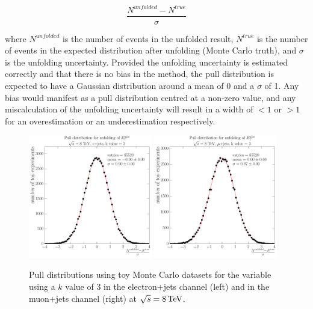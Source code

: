 \begin{equation}
\frac{N^{unfolded}-N^{true}}{\sigma}
\label{eq:pulls}
\end{equation}

where $N^{unfolded}$ is the number of events in the unfolded result, $N^{true}$ is the number of events in the
expected distribution after unfolding (Monte Carlo truth), and $\sigma$ is the unfolding uncertainty. Provided
the unfolding uncertainty is estimated correctly and that there is no bias in the method, the pull
distribution is expected to have a Gaussian distribution around a mean of 0 and a $\sigma$ of 1. Any bias
would manifest as a pull distribution centred at a non-zero value, and any miscalculation of the
unfolding uncertainty will result in a width of $<1$ or $>1$ for an overestimation or an underestimation
respectively.

\begin{figure}[hbtp]
    \centering
     \includegraphics[width=0.48\textwidth]{Chapters/04_Analysis/04b_XSections/images/unfolding_pulls/8TeV/MET/electron/kv3/pull_from_files_all_bins_stats_65520.pdf}\hfill
     \includegraphics[width=0.48\textwidth]{Chapters/04_Analysis/04b_XSections/images/unfolding_pulls/8TeV/MET/muon/kv3/pull_from_files_all_bins_stats_65520.pdf}\\
	 \caption[Pull distribution using toy Monte Carlo datasets for the \met variable using a $k$ value of 3 for
	 the \met variable at $\roots=8\TeV$]{Pull distributions using toy Monte Carlo datasets for the \met variable
	 using a $k$ value of 3 in the electron+jets channel (left) and in the muon+jets channel (right) at $\roots=8\TeV$.}
     \label{fig:unfolding_pull_tests}
\end{figure}

